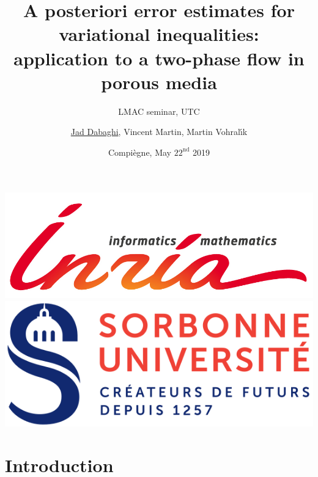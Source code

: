 \documentclass[aspectratio=169]{beamer}
\title{A posteriori error estimates for variational inequalities: \\
application to a two-phase flow in porous media}
\subtitle{LMAC seminar, UTC}
\author[Jad Dabaghi]
{\underline{Jad Dabaghi}, Vincent Martin, Martin Vohral{\'{\i}}k}
\institute[]{INRIA Paris \& ENPC}
\date{Compiègne, May $22^{\mathrm{nd}}$ 2019}
\begin{document}
\begin{frame}
\maketitle
\vspace{0.5 cm}
\includegraphics[scale=0.3]{INRIA-SCIENTIFIQUE-UK-RVB}
\hfill
\includegraphics[scale=0.2]{logo_sorbonne}

\end{frame}
\section{Introduction}
\end{document}
